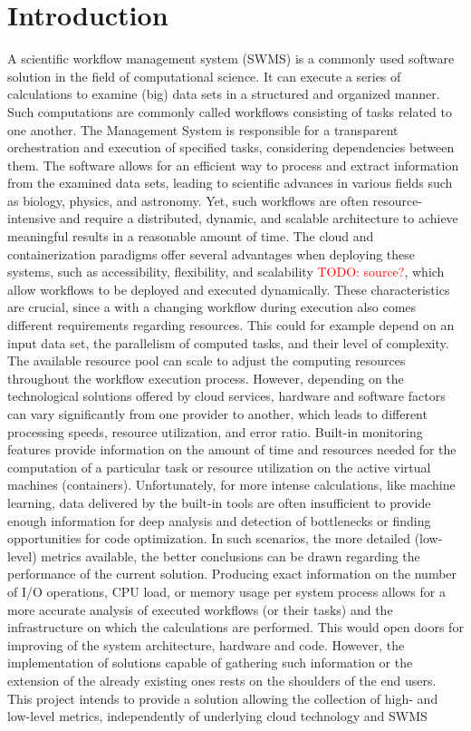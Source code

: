 \documentclass[a4paper,journal]{IEEEtran}
\newcommand{\todo}[1]{\textcolor{red}{TODO: #1}\PackageWarning{TODO:}{#1!}}
\begin{document}
	
	\section{Introduction}
	A scientific workflow management system (SWMS) is a commonly used software solution in the field of computational science. It can execute a series of calculations to examine (big) data sets in a structured and organized manner. Such computations are commonly called workflows consisting of tasks related to one another. The Management System is responsible for a transparent orchestration and execution of specified tasks, considering dependencies between them. The software allows for an efficient way to process and extract information from the examined data sets, leading to scientific advances in various fields such as biology, physics, and astronomy\cite{gil2007examiningchallengesscientific}. Yet, such workflows are often resource-intensive and require a distributed, dynamic, and scalable architecture to achieve meaningful results in a reasonable amount of time. The cloud and containerization paradigms offer several advantages when deploying these systems, such as accessibility, flexibility, and scalability \todo{source?}, which allow workflows to be deployed and executed dynamically. These characteristics are crucial, since a with a changing workflow during execution also comes different requirements regarding resources. This could for example depend on an input data set, the parallelism of computed tasks, and their level of complexity. The available resource pool can scale to adjust the computing resources throughout the workflow execution process. However, depending on the technological solutions offered by cloud services, hardware and software factors can vary significantly from one provider to another, which leads to different processing speeds, resource utilization, and error ratio\cite{aljamal2018comparativereviewhighperformance}. Built-in monitoring features provide information on the amount of time and resources needed for the computation of a particular task or resource utilization on the active virtual machines (containers). Unfortunately, for more intense calculations, like machine learning, data delivered by the built-in tools are often insufficient to provide enough information for deep analysis and detection of bottlenecks or finding opportunities for code optimization. In such scenarios, the more detailed (low-level) metrics available, the better conclusions can be drawn regarding the performance of the current solution. Producing exact information on the number of I/O operations, CPU load, or memory usage per system process allows for a more accurate analysis of executed workflows (or their tasks) and the infrastructure on which the calculations are performed. This would open doors for improving of the system architecture, hardware and code. However, the implementation of solutions capable of gathering such information or the extension of the already existing ones rests on the shoulders of the end users. This project intends to provide a solution allowing the collection of high- and low-level metrics, independently of underlying cloud technology and SWMS 
\end{document}
